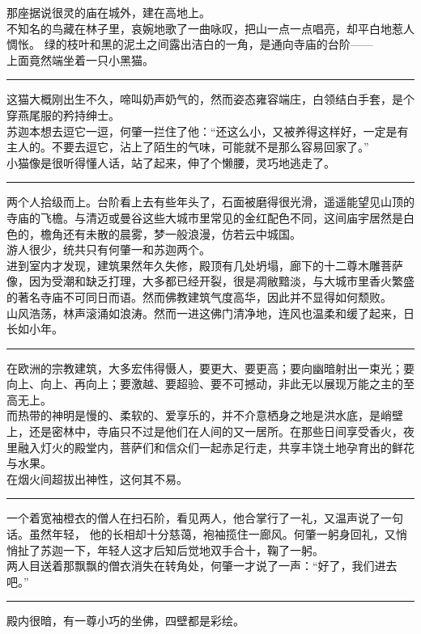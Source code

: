 \documentclass[oneside,11pt]{memoir} %
\begin{document}
\begin{CJK}{UTF8}{gbsn}
    那座据说很灵的庙在城外，建在高地上。\\\indent
    不知名的鸟藏在林子里，哀婉地歌了一曲咏叹，把山一点一点唱亮，却平白地惹人惆怅。
    绿的枝叶和黑的泥土之间露出洁白的一角，是通向寺庙的台阶——\\\indent
    上面竟然端坐着一只小黑猫。\\\indent
\rule{-3pt}{30pt}
    这猫大概刚出生不久，啼叫奶声奶气的，然而姿态雍容端庄，白领结白手套，是个穿燕尾服的矜持绅士。\\\indent
    苏迦本想去逗它一逗，何肇一拦住了他：“还这么小，又被养得这样好，一定是有主人的。不要去逗它，沾上了陌生的气味，可能就不是那么容易回家了。”\\\indent
    小猫像是很听得懂人话，站了起来，伸了个懒腰，灵巧地逃走了。\\\indent
\rule{-3pt}{30pt}
    两个人拾级而上。台阶看上去有些年头了，石面被磨得很光滑，遥遥能望见山顶的寺庙的飞檐。与清迈或曼谷这些大城市里常见的金红配色不同，这间庙宇居然是白色的，檐角还有未散的晨雾，梦一般浪漫，仿若云中城国。\\\indent
    游人很少，统共只有何肇一和苏迦两个。\\\indent
    进到室内才发现，建筑果然年久失修，殿顶有几处坍塌，廊下的十二尊木雕菩萨像，因为受潮和缺乏打理，大多都已经开裂，很是凋敝黯淡，与大城市里香火繁盛的著名寺庙不可同日而语。然而佛教建筑气度高华，因此并不显得如何颓败。\\\indent
    山风浩荡，林声滚涌如浪涛。然而一进这佛门清净地，连风也温柔和缓了起来，日长如小年。\\\indent
\rule{-3pt}{30pt}
    在欧洲的宗教建筑，大多宏伟得慑人，要更大、要更高；要向幽暗射出一束光；要向上、向上、再向上；要激越、要超验、要不可撼动，非此无以展现万能之主的至高无上。\\\indent
    而热带的神明是慢的、柔软的、爱享乐的，并不介意栖身之地是洪水底，是峭壁上，还是密林中，寺庙只不过是他们在人间的又一居所。在那些日间享受香火，夜里融入灯火的殿堂内，菩萨们和信众们一起赤足行走，共享丰饶土地孕育出的鲜花与水果。\\\indent
    在烟火间超拔出神性，这何其不易。\\\indent
\rule{-3pt}{30pt}
    一个着宽袖橙衣的僧人在扫石阶，看见两人，他合掌行了一礼，又温声说了一句话。虽然年轻， 他的长相却十分慈蔼，袍袖揽住一廊风。何肇一躬身回礼，又悄悄扯了苏迦一下，年轻人这才后知后觉地双手合十，鞠了一躬。\\\indent
    两人目送着那飘飘的僧衣消失在转角处，何肇一才说了一声：“好了，我们进去吧。”\\\indent
\rule{-3pt}{30pt}
    殿内很暗，有一尊小巧的坐佛，四壁都是彩绘。\\\indent

\end{CJK}
\end{document}
